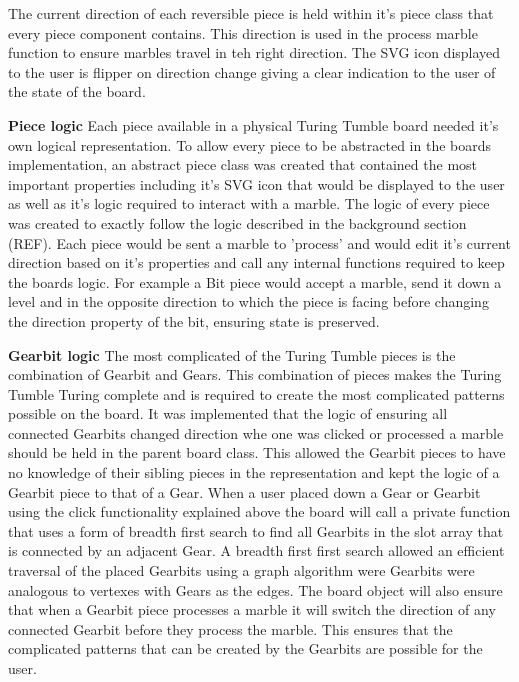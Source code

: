 \documentclass{l4proj}
\begin{document}
The current direction of each reversible piece is held within it's piece class that every piece component contains. This direction is used in the process marble function to ensure marbles travel in teh right direction. The SVG icon displayed to the user is flipper on direction change giving a clear indication to the user of the state of the board.

\textbf{Piece logic}
Each piece available in a physical Turing Tumble board needed it's own logical representation. To allow every piece to be abstracted in the boards implementation, an abstract piece class was created that contained the most important properties including it's SVG icon that would be displayed to the user as well as it's logic required to interact with a marble. The logic of every piece was created to exactly follow the logic described in the background section (REF). Each piece would be sent a marble to 'process' and would edit it's current direction based on it's properties and call any internal functions required to keep the boards logic. For example a Bit piece would accept a marble, send it down a level and in the opposite direction to which the piece is facing before changing the direction property of the bit, ensuring state is preserved. 

\textbf{Gearbit logic} 
The most complicated of the Turing Tumble pieces is the combination of Gearbit and Gears. This combination of pieces makes the Turing Tumble Turing complete and is required to create the most complicated patterns possible on the board. It was implemented that the logic of ensuring all connected Gearbits changed direction whe one was clicked or processed a marble should be held in the parent board class. This allowed the Gearbit pieces to have no knowledge of their sibling pieces in the representation and kept the logic of a Gearbit piece to that of a Gear. When a user placed down a Gear or Gearbit using the click functionality explained above the board will call a private function that uses a form of breadth first search to find all Gearbits in the slot array that is connected by an adjacent Gear. A breadth first first search allowed an efficient traversal of the placed Gearbits using a graph algorithm were Gearbits were analogous to vertexes with Gears as the edges. The board object will also ensure that when a Gearbit piece processes a marble it will switch the direction of any connected Gearbit before they process the marble. This ensures that the complicated patterns that can be created by the Gearbits are possible for the user.
\end{document}
